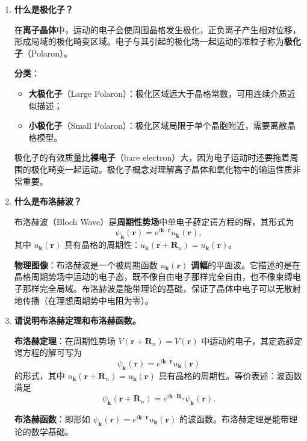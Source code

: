 \begin{enumerate}[label=\textbf{\arabic*.}, leftmargin=2em, itemsep=0.8em, resume]
\item \textbf{什么是极化子？}

在\textbf{离子晶体}中，运动的电子会使周围晶格发生极化，正负离子产生相对位移，形成局域的极化畸变区域。电子与其引起的极化场一起运动的准粒子称为\textbf{极化子}（Polaron）。

\textbf{分类}：
\begin{itemize}[nosep]
    \item \textbf{大极化子}（Large Polaron）：极化区域远大于晶格常数，可用连续介质近似描述；
    \item \textbf{小极化子}（Small Polaron）：极化区域局限于单个晶胞附近，需要离散晶格模型。
\end{itemize}

极化子的有效质量比\textbf{裸电子}（bare electron）大，因为电子运动时还要拖着周围的极化畸变一起运动。极化子概念对理解离子晶体和氧化物中的输运性质非常重要。

\item \textbf{什么是布洛赫波？}

布洛赫波（Bloch Wave）是\textbf{周期性势场}中单电子薛定谔方程的解，其形式为
\[
    \psi_{\mathbf{k}}(\mathbf{r}) = e^{i\mathbf{k}\cdot\mathbf{r}} u_{\mathbf{k}}(\mathbf{r}),
\]
其中 $u_{\mathbf{k}}(\mathbf{r})$ 具有晶格的周期性：$u_{\mathbf{k}}(\mathbf{r} + \mathbf{R}_n) = u_{\mathbf{k}}(\mathbf{r})$。

\textbf{物理图像}：布洛赫波是一个被周期函数 $u_{\mathbf{k}}(\mathbf{r})$ \textbf{调幅}的平面波。它描述的是在晶格周期势场中运动的电子态，既不像自由电子那样完全自由，也不像束缚电子那样完全局域。布洛赫波是能带理论的基础，保证了晶体中电子可以无散射地传播（在理想周期势中电阻为零）。

\item \textbf{请说明布洛赫定理和布洛赫函数。}

\textbf{布洛赫定理}：在周期性势场 $V(\mathbf{r} + \mathbf{R}_n) = V(\mathbf{r})$ 中运动的电子，其定态薛定谔方程的解可写为
\[
    \psi_{\mathbf{k}}(\mathbf{r}) = e^{i\mathbf{k}\cdot\mathbf{r}} u_{\mathbf{k}}(\mathbf{r})
\]
的形式，其中 $u_{\mathbf{k}}(\mathbf{r} + \mathbf{R}_n) = u_{\mathbf{k}}(\mathbf{r})$ 具有晶格的周期性。等价表述：波函数满足
\[
    \psi_{\mathbf{k}}(\mathbf{r} + \mathbf{R}_n) = e^{i\mathbf{k}\cdot\mathbf{R}_n} \psi_{\mathbf{k}}(\mathbf{r}).
\]

\textbf{布洛赫函数}：即形如 $\psi_{\mathbf{k}}(\mathbf{r}) = e^{i\mathbf{k}\cdot\mathbf{r}} u_{\mathbf{k}}(\mathbf{r})$ 的波函数。布洛赫定理是能带理论的数学基础。


\end{enumerate}
